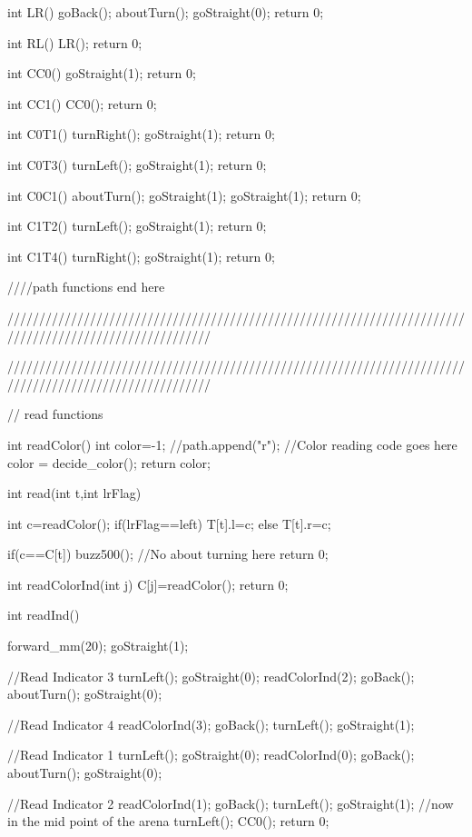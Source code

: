 int LR()
{
    goBack();
	aboutTurn();
	goStraight(0);
    return 0;
}

int RL()
{
    LR();
    return 0;
}

int CC0()
{
	goStraight(1);
	return 0;
}

int CC1()
{
	CC0();
	return 0;
}

int C0T1()
{
	turnRight();
	goStraight(1);
	return 0;
}

int C0T3()
{
    turnLeft();
    goStraight(1);
	return 0;
}

int C0C1()
{
	aboutTurn();
	goStraight(1);
	goStraight(1);
	return 0;
}

int C1T2()
{
	turnLeft();
	goStraight(1);
	return 0;
}

int C1T4()
{
	turnRight();
	goStraight(1);
	return 0;
}

////path functions end here

////////////////////////////////////////////////////////////////////////////////////////////////////////


////////////////////////////////////////////////////////////////////////////////////////////////////////


// read functions


int readColor()
{
	int color=-1;
	//path.append("r");
	//Color reading code goes here
	color = decide_color();
	return color;
}

int read(int t,int lrFlag)
{
	int c=readColor();
    if(lrFlag==left)
        T[t].l=c;
    else
        T[t].r=c;
    
	if(c==C[t])
		buzz500();
	//No about turning here
    return 0;
}

int readColorInd(int j)
{
	C[j]=readColor();
	return 0;
}

int readInd()
{
	forward_mm(20);
    goStraight(1);
    
    //Read Indicator 3
    turnLeft();
	goStraight(0);
    readColorInd(2);
    goBack();
    aboutTurn();
	goStraight(0);
    
    //Read Indicator 4
    readColorInd(3);
    goBack();
	turnLeft();
    goStraight(1);
    
    
    //Read Indicator 1
    turnLeft();
    goStraight(0);
    readColorInd(0);
    goBack();
    aboutTurn();
    goStraight(0);
    
    //Read Indicator 2
    readColorInd(1);
    goBack();
    turnLeft();
    goStraight(1);
    //now in the mid point of the arena
    turnLeft();
	CC0();
    return 0;
}

